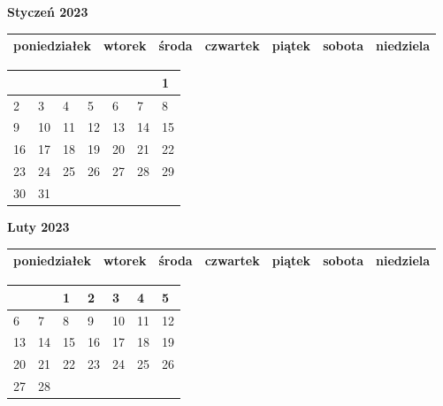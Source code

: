 \begin{landscape}
    \begin{center}
        \textbf{\huge{Styczeń 2023}}
    \end{center}

    \vspace{-3mm}

    \thispagestyle{empty}
    \noindent
    \begin{tabularx}{28.7cm}{|Y|Y|Y|Y|Y|Y|Y|}
        \hline
poniedziałek & wtorek & środa & czwartek & piątek & sobota & niedziela \\ [-0.5mm]
        \hline
    \end{tabularx}

    \vspace{-0.5mm}

    \noindent
    \begin{tabularx}{28.7cm}{|X|X|X|X|X|X|X|}
        \hline
& & & & & & 1 \\ [25.0mm]
\hline
2 & 3 & 4 & 5 & 6 & 7 & 8 \\ [25.0mm]
\hline
9 & 10 & 11 & 12 & 13 & 14 & 15 \\ [25.0mm]
\hline
16 & 17 & 18 & 19 & 20 & 21 & 22 \\ [25.0mm]
\hline
23 & 24 & 25 & 26 & 27 & 28 & 29 \\ [25.0mm]
\hline
30 & 31 & & & & & \\ [25.0mm]
\hline

    \end{tabularx}
\end{landscape}

\clearpage

\begin{landscape}
    \begin{center}
        \textbf{\huge{Luty 2023}}
    \end{center}

    \vspace{-3mm}

    \thispagestyle{empty}
    \noindent
    \begin{tabularx}{28.7cm}{|Y|Y|Y|Y|Y|Y|Y|}
        \hline
poniedziałek & wtorek & środa & czwartek & piątek & sobota & niedziela \\ [-0.5mm]
        \hline
    \end{tabularx}

    \vspace{-0.5mm}

    \noindent
    \begin{tabularx}{28.7cm}{|X|X|X|X|X|X|X|}
        \hline
& & 1 & 2 & 3 & 4 & 5 \\ [31.0mm]
\hline
6 & 7 & 8 & 9 & 10 & 11 & 12 \\ [31.0mm]
\hline
13 & 14 & 15 & 16 & 17 & 18 & 19 \\ [31.0mm]
\hline
20 & 21 & 22 & 23 & 24 & 25 & 26 \\ [31.0mm]
\hline
27 & 28 & & & & & \\ [31.0mm]
\hline

    \end{tabularx}
\end{landscape}

